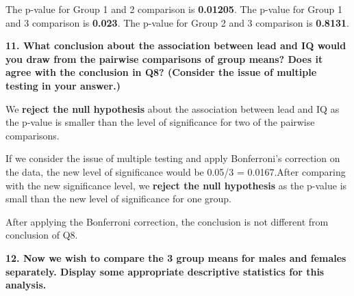 \documentclass[
]{article}
\newenvironment{Shaded}{\begin{snugshade}}{\end{snugshade}}
\newcommand{\DecValTok}[1]{\textcolor[rgb]{0.00,0.00,0.81}{#1}}
\newcommand{\KeywordTok}[1]{\textcolor[rgb]{0.13,0.29,0.53}{\textbf{#1}}}
\newcommand{\NormalTok}[1]{#1}
\newcommand{\OperatorTok}[1]{\textcolor[rgb]{0.81,0.36,0.00}{\textbf{#1}}}
\newcommand{\StringTok}[1]{\textcolor[rgb]{0.31,0.60,0.02}{#1}}
\begin{document}
The p-value for Group 1 and 2 comparison is \textbf{0.01205}. The
p-value for Group 1 and 3 comparison is \textbf{0.023}. The p-value for
Group 2 and 3 comparison is \textbf{0.8131}.

\textbf{11. What conclusion about the association between lead and IQ
would you draw from the pairwise comparisons of group means? Does it
agree with the conclusion in Q8? (Consider the issue of multiple testing
in your answer.)}

We \textbf{reject the null hypothesis} about the association between
lead and IQ as the p-value is smaller than the level of significance for
two of the pairwise comparisons.

If we consider the issue of multiple testing and apply Bonferroni's
correction on the data, the new level of significance would be 0.05/3 =
0.0167.After comparing with the new significance level, we
\textbf{reject the null hypothesis} as the p-value is small than the new
level of significance for one group.

After applying the Bonferroni correction, the conclusion is not
different from conclusion of Q8.

\textbf{12. Now we wish to compare the 3 group means for males and
females separately. Display some appropriate descriptive statistics for
this analysis.}

\begin{Shaded}
\end{Shaded}
\end{document}
